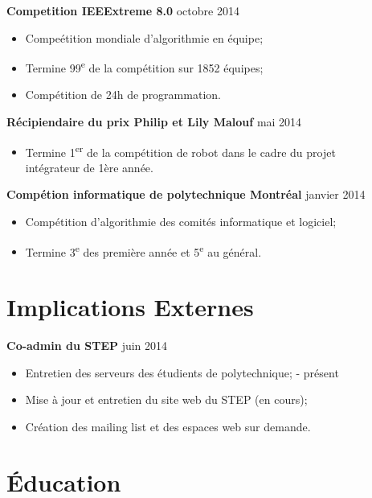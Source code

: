 \documentclass[margin]{res}
\begin{document}
\begin{resume}
  {\bf Competition IEEExtreme 8.0} \hfill octobre 2014
  \begin{itemize} \itemsep -2pt
  \item Compe\'etition mondiale d'algorithmie en \'equipe;
  \item Termine 99\textsuperscript{e} de la comp\'etition sur 1852 \'equipes;
  \item Comp\'etition de 24h de programmation.
  \end{itemize}
  
  {\bf R\'{e}cipiendaire du prix Philip et Lily Malouf} \hfill mai 2014
  \begin{itemize} \itemsep -2pt
  \item Termine 1\textsuperscript{er} de la comp\'{e}tition de robot dans le cadre du projet\\   int\'{e}grateur de 1\`{e}re ann\'{e}e.
  \end{itemize}
  
  {\bf Comp\'{e}tion informatique de polytechnique Montr\'{e}al} \hfill janvier 2014
  \begin{itemize} \itemsep -2pt
  \item Comp\'{e}tition d'algorithmie des comit\'{e}s informatique et logiciel;
  \item Termine 3\textsuperscript{e} des premi\`{e}re ann\'{e}e et 5\textsuperscript{e} au g\'{e}n\'{e}ral.
  \end{itemize}


  \section{Implications Externes}
  
  {\bf Co-admin du STEP} \hfill juin 2014
  \begin{itemize} \itemsep -2pt
  \item Entretien des serveurs des \'etudients de polytechnique; \hfill - pr\'esent
  \item Mise \`{a} jour et entretien du site web du STEP (en cours);
  \item Cr\'{e}ation des mailing list et des espaces web sur demande.
  \end{itemize}
  

  \section{\'{E}ducation}
  

\end{resume}
\end{document}
